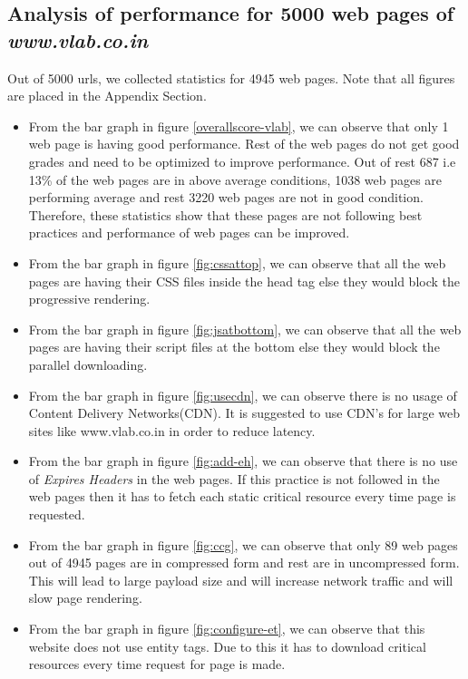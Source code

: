 \documentclass[conference]{IEEEtran}
\begin{document}
\subsection{Analysis of performance for 5000 web pages of {\it www.vlab.co.in}}
 Out of 5000 urls, we collected statistics for 4945 web pages. Note that all figures are placed in the Appendix Section.
\begin{itemize}
\item From the bar graph in figure \ref{overallscore-vlab}, we can observe that only 1 web page is having good
performance. Rest of the web pages do not get good grades and need to be
optimized to improve performance. Out of rest 687 i.e 13\% of the web pages are in above average conditions, 1038
web pages are performing average and rest 3220 web pages are not in good
condition. Therefore, these statistics show that these pages are not following
best practices and performance of web pages can be improved.  
 
\item From the bar graph in figure \ref{fig:cssattop}, we can observe that all the web pages are having their
CSS files inside the head tag else they would block the progressive rendering.

\item From the bar graph in figure \ref{fig:jsatbottom}, we can observe that all the web pages are having their
script files at the bottom else they would block the parallel downloading.

\item From the bar graph in figure \ref{fig:usecdn}, we can observe there is no usage of Content Delivery
Networks(CDN). It is suggested to use CDN's for large web sites like www.vlab.co.in in order to reduce latency.

\item From the bar graph in figure \ref{fig:add-eh}, we can observe that there is no use of {\it Expires
Headers} in the web pages. If this practice is not followed in the web pages then it has to
fetch each static critical resource every time page is requested.

\item From the bar graph in figure \ref{fig:ccg}, we can observe that only 89 web pages out of 4945
pages are in compressed form and rest are in uncompressed form. This will lead to
large payload size and will increase network traffic and will slow page rendering.

\item From the bar graph in figure \ref{fig:configure-et}, we can observe that this website does not use entity
tags. Due to this it has to download critical resources every time request for page is made.


\end{itemize}
\end{document}
